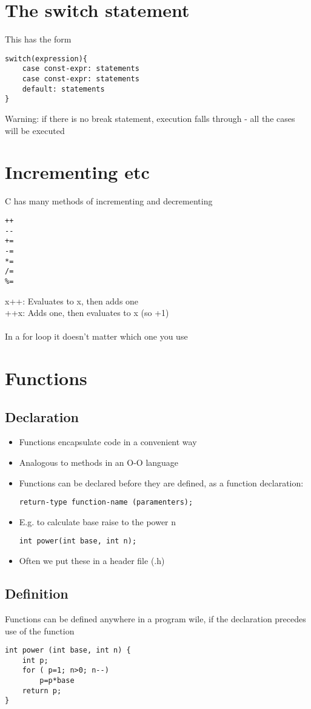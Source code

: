 \documentclass{article}[18pt]
\begin{document}
\section{The switch statement}
This has the form
\begin{verbatim}
switch(expression){
	case const-expr: statements
	case const-expr: statements
	default: statements
}
\end{verbatim}
Warning: if there is no break statement, execution falls through - all the cases will be executed
\section{Incrementing etc}
C has many methods of incrementing and decrementing
\begin{verbatim}
++
--
+=
-=
*=
/=
%=
\end{verbatim}
x++: Evaluates to x, then adds one\\
++x: Adds one, then evaluates to x (so +1)\\
\\
In a for loop it doesn't matter which one you use
\section{Functions}
\subsection{Declaration}
\begin{itemize}
	\item Functions encapsulate code in a convenient way
	\item Analogous to methods in an O-O language
	\item Functions can be declared before they are defined, as a function declaration:
	\begin{verbatim}
return-type function-name (paramenters);
	\end{verbatim}
	\item E.g. to calculate base raise to the power n
\begin{verbatim}
int power(int base, int n);
\end{verbatim}
	\item Often we put these in a header file (.h)
\end{itemize}
\subsection{Definition}
Functions can be defined anywhere in a program wile, if the declaration precedes use of the function
\begin{verbatim}
int power (int base, int n) {
	int p;
	for ( p=1; n>0; n--)
		p=p*base
	return p;
}
\end{verbatim}
\end{document}
